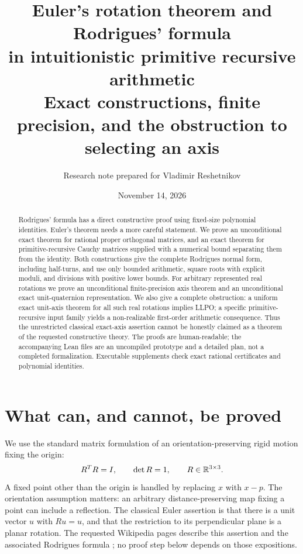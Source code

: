 \documentclass[11pt]{article}
\title{\textbf{Euler's rotation theorem and Rodrigues' formula\\in intuitionistic primitive recursive arithmetic}\\[8pt]
\large Exact constructions, finite precision, and the obstruction to selecting an axis}
\author{Research note prepared for Vladimir Reshetnikov}
\date{November 14, 2026}
\theoremstyle{definition}\newtheorem{definition}[theorem]{Definition}
\begin{document}
\maketitle
\begin{abstract}
Rodrigues' formula has a direct constructive proof using fixed-size polynomial
identities. Euler's theorem needs a more careful statement. We prove an
unconditional exact theorem for rational proper orthogonal matrices, and an
exact theorem for primitive-recursive Cauchy matrices supplied with a numerical
bound separating them from the identity. Both constructions give the complete
Rodrigues normal form, including half-turns, and use only bounded arithmetic,
square roots with explicit moduli, and divisions with positive lower bounds.
For arbitrary represented real rotations we prove an unconditional
finite-precision axis theorem and an unconditional exact unit-quaternion
representation. We also give a complete obstruction: a uniform exact unit-axis
theorem for all such real rotations implies LLPO; a specific primitive-recursive
input family yields a non-realizable first-order arithmetic consequence.
Thus the unrestricted classical exact-axis assertion cannot be honestly
claimed as a theorem of the requested constructive theory.
The proofs are human-readable; the accompanying Lean files are an uncompiled
prototype and a detailed plan, not a completed formalization. Executable
supplements check exact rational certificates and polynomial identities.
\end{abstract}
\tableofcontents
\newpage

\section{What can, and cannot, be proved}
\label{sec:scope}

We use the standard matrix formulation of an orientation-preserving rigid
motion fixing the origin:
\begin{equation}\label{eq:so}
 R^T R=I,\qquad \det R=1,\qquad R\in\mathbb R^{3\times3}.
\end{equation}
A fixed point other than the origin is handled by replacing $x$ with $x-p$.
The orientation assumption matters: an arbitrary distance-preserving map
fixing a point can include a reflection. The classical Euler assertion is that
there is a unit vector $u$ with $Ru=u$, and that the restriction to its
perpendicular plane is a planar rotation. The requested Wikipedia pages
describe this assertion and the associated Rodrigues formula
\cite{eulerwiki,rodrigueswiki}; no proof step below depends on those expositions.
\end{document}
